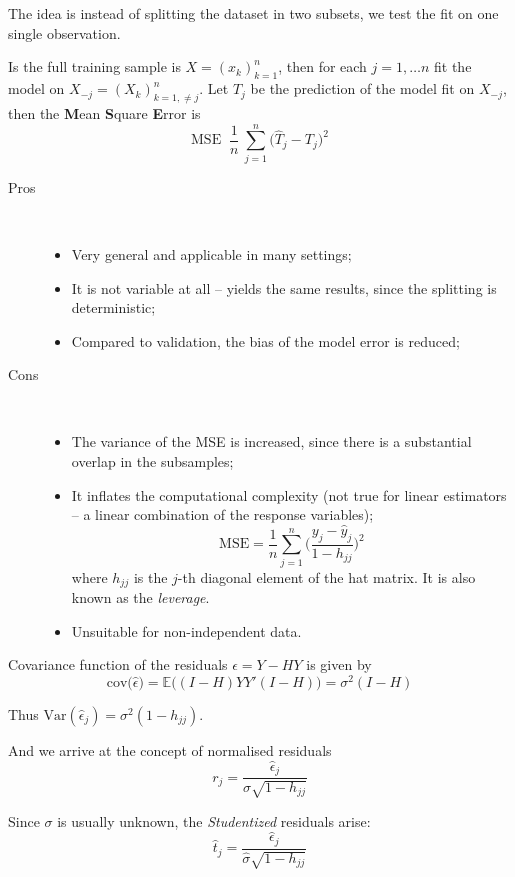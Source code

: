\documentclass[a4paper]{article}
\newcommand{\brac}[1]{{\left ( #1 \right )}}
\newcommand{\Ex}[0]{{\mathbb{E}}}
\newcommand{\Var}[0]{{\text{Var}}}
\newcommand{\defn}{\mathop{\overset{\Delta}{=}}\nolimits}
\begin{document}
The idea is instead of splitting the dataset in two subsets, we test the fit on one single observation.

Is the full training sample is $X=\brac{x_k}_{k=1}^n$, then for each $j=1,\ldots n$ fit the model on $X_{-j} = \brac{X_k}_{k=1,\neq j}^n$.
Let $\hat{T}_j$ be the prediction of the model fit on $X_{-j}$, then the \textbf{M}ean \textbf{S}quare \textbf{E}rror is 
\[\text{MSE} \defn \frac{1}{n}\ \sum_{j=1}^n \big(\hat{T}_j - T_j\big)^2 \]

\begin{description}
	\item[Pros] \hfill\\
		\begin{itemize}
			\item Very general and applicable in many settings;
			\item It is not variable at all -- yields the same results, since the splitting is deterministic;
			\item Compared to validation, the bias of the model error is reduced;
		\end{itemize}
	\item[Cons] \hfill\\
		\begin{itemize}
			\item The variance of the MSE is increased, since there is a substantial overlap in the subsamples;
			\item It inflates the computational complexity (not true for linear estimators -- a linear combination of the response variables);
			\[\text{MSE} = \frac{1}{n}\sum_{j=1}^n \Big(\frac{y_j - \hat{y}_j}{1-h_{jj}}\Big)^2\]
			where $h_{jj}$ is the $j$-th diagonal element of the hat matrix. It is also known as the \emph{leverage}.
			\item Unsuitable for non-independent data.
		\end{itemize}
\end{description}

Covariance function of the residuals $\epsilon = Y - H Y$ is given by 
\[\text{cov}\big(\hat{\epsilon}\big) = \Ex\big( (I-H)YY'(I-H) \big) = \sigma^2 (I-H)\]

Thus $\Var(\hat{\epsilon}_j) = \sigma^2 (1-h_{jj})$.

And we arrive at the concept of normalised residuals
\[r_j = \frac{\hat{\epsilon}_j}{\sigma \sqrt{1-h_{jj}}}\]

Since $\sigma$ is usually unknown, the \emph{Studentized} residuals arise:
\[ \hat{t}_j = \frac{\hat{\epsilon}_j}{\hat{\sigma} \sqrt{1-h_{jj}}}\]
\end{document}
